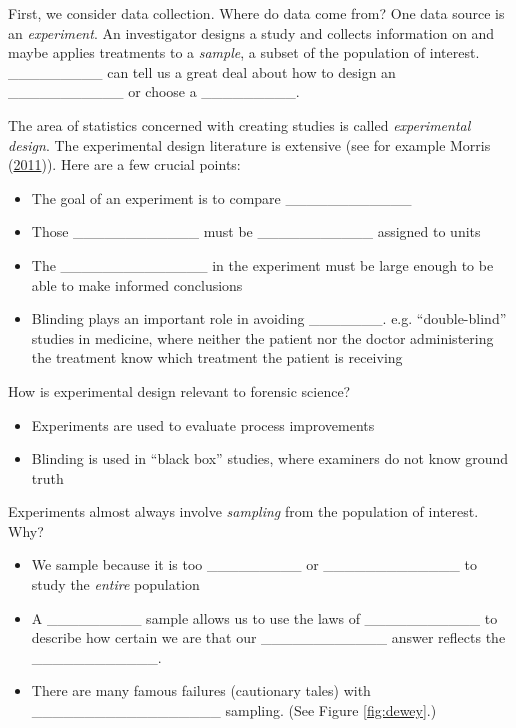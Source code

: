 \documentclass[]{book}
\providecommand{\tightlist}{%
  \setlength{\itemsep}{0pt}\setlength{\parskip}{0pt}}
\theoremstyle{definition}
\theoremstyle{definition}
\theoremstyle{remark}
\begin{document}
First, we consider data collection. Where do data come from? One data
source is an \emph{experiment}. An investigator designs a study and
collects information on and maybe applies treatments to a \emph{sample},
a subset of the population of interest. \_\_\_\_\_\_\_\_\_ can tell us a
great deal about how to design an \_\_\_\_\_\_\_\_\_\_\_ or choose a
\_\_\_\_\_\_\_\_\_.

The area of statistics concerned with creating studies is called
\emph{experimental design}. The experimental design literature is
extensive (see for example Morris (\protect\hyperlink{ref-doe}{2011})).
Here are a few crucial points:

\begin{itemize}
\tightlist
\item
  The goal of an experiment is to compare \_\_\_\_\_\_\_\_\_\_\_\_
  \vspace{.1in}
\item
  Those \_\_\_\_\_\_\_\_\_\_\_\_ must be \_\_\_\_\_\_\_\_\_\_\_ assigned
  to units \vspace{.1in}
\item
  The \_\_\_\_\_\_\_\_\_\_\_\_\_\_ in the experiment must be large
  enough to be able to make informed conclusions
\item
  Blinding plays an important role in avoiding \_\_\_\_\_\_\_. e.g.
  ``double-blind'' studies in medicine, where neither the patient nor
  the doctor administering the treatment know which treatment the
  patient is receiving
\end{itemize}

How is experimental design relevant to forensic science?

\begin{itemize}
\tightlist
\item
  Experiments are used to evaluate process improvements
\item
  Blinding is used in ``black box'' studies, where examiners do not know
  ground truth
\end{itemize}

Experiments almost always involve \emph{sampling} from the population of
interest. Why?

\begin{itemize}
\tightlist
\item
  We sample because it is too \_\_\_\_\_\_\_\_\_ or
  \_\_\_\_\_\_\_\_\_\_\_\_\_ to study the \emph{entire} population
  \vspace{.1in}
\item
  A \_\_\_\_\_\_\_\_\_ sample allows us to use the laws of
  \_\_\_\_\_\_\_\_\_\_\_ to describe how certain we are that our
  \_\_\_\_\_\_\_\_\_\_\_\_ answer reflects the \_\_\_\_\_\_\_\_\_\_\_\_.
\item
  There are many famous failures (cautionary tales) with
  \_\_\_\_\_\_\_\_\_\_\_\_\_\_\_\_\_\_ sampling. (See Figure
  \ref{fig:dewey}.)
\end{itemize}
\end{document}
